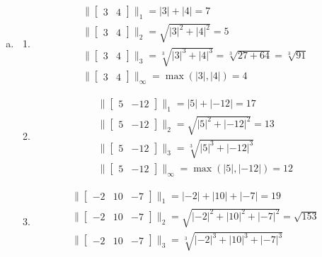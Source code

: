 \documentclass[11pt]{article}
\begin{document}
\begin{enumerate}[a.]
	\item %
\begin{enumerate}
	\item %
$$
\begin{array}{l}
\|
\begin{bmatrix}
3 & 4
\end{bmatrix}\|_1 = |3| + |4| = 7 \\
\|
\begin{bmatrix}
3 & 4
\end{bmatrix}\|_2 = \sqrt{|3|^2+|4|^2}=5\\
\|
\begin{bmatrix}
3 & 4
\end{bmatrix}\|_3 = \sqrt[3]{|3|^3+|4|^3}=\sqrt[3]{27+64}=\sqrt[3]{91}\\
\|
\begin{bmatrix}
3 & 4
\end{bmatrix}\|_\infty = \max(|3|, |4|) = 4
\end{array}
$$
	\item %
$$
\begin{array}{l}
\|
\begin{bmatrix}
5 & -12
\end{bmatrix}\|_1 = |5| + |-12| = 17 \\
\|
\begin{bmatrix}
5 & -12
\end{bmatrix}\|_2 = \sqrt{|5|^2+|-12|^2}=13\\
\|
\begin{bmatrix}
5 & -12
\end{bmatrix}\|_3 = \sqrt[3]{|5|^3+|-12|^3} \\
\|
\begin{bmatrix}
5 & -12
\end{bmatrix}\|_\infty = \max(|5|, |-12|) = 12
\end{array}
$$
	\item %
$$
\begin{array}{l}
\|
\begin{bmatrix}
-2 & 10 & -7
\end{bmatrix}\|_1 = |-2| + |10| + |-7| = 19 \\
\|
\begin{bmatrix}
-2 & 10 & -7
\end{bmatrix}\|_2 = \sqrt{|-2|^2+|10|^2+|-7|^2}=\sqrt{153}\\
\|
\begin{bmatrix}
-2 & 10 & -7
\end{bmatrix}\|_3 = \sqrt[3]{|-2|^3+|10|^3+|-7|^3} \\

\end{array}$$
\end{enumerate}
\end{enumerate}
\end{document}

